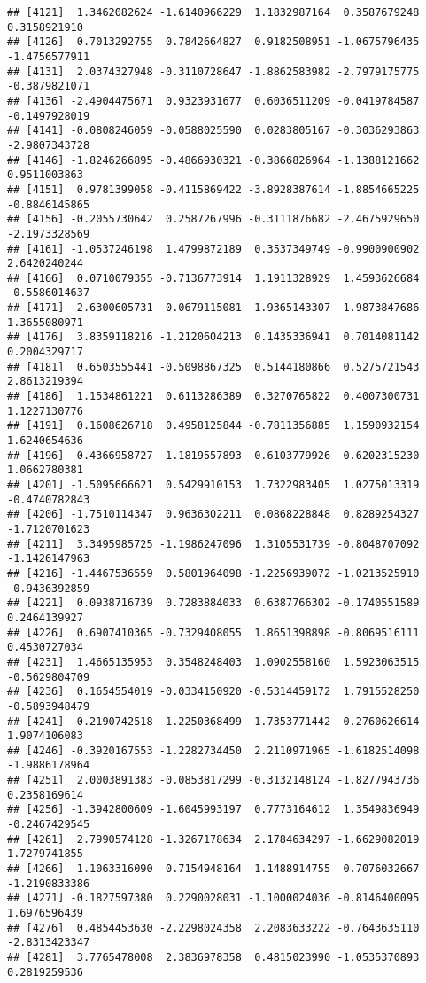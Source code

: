 \documentclass[
]{article}
\begin{document}
\begin{verbatim}
## [4121]  1.3462082624 -1.6140966229  1.1832987164  0.3587679248  0.3158921910
## [4126]  0.7013292755  0.7842664827  0.9182508951 -1.0675796435 -1.4756577911
## [4131]  2.0374327948 -0.3110728647 -1.8862583982 -2.7979175775 -0.3879821071
## [4136] -2.4904475671  0.9323931677  0.6036511209 -0.0419784587 -0.1497928019
## [4141] -0.0808246059 -0.0588025590  0.0283805167 -0.3036293863 -2.9807343728
## [4146] -1.8246266895 -0.4866930321 -0.3866826964 -1.1388121662  0.9511003863
## [4151]  0.9781399058 -0.4115869422 -3.8928387614 -1.8854665225 -0.8846145865
## [4156] -0.2055730642  0.2587267996 -0.3111876682 -2.4675929650 -2.1973328569
## [4161] -1.0537246198  1.4799872189  0.3537349749 -0.9900900902  2.6420240244
## [4166]  0.0710079355 -0.7136773914  1.1911328929  1.4593626684 -0.5586014637
## [4171] -2.6300605731  0.0679115081 -1.9365143307 -1.9873847686  1.3655080971
## [4176]  3.8359118216 -1.2120604213  0.1435336941  0.7014081142  0.2004329717
## [4181]  0.6503555441 -0.5098867325  0.5144180866  0.5275721543  2.8613219394
## [4186]  1.1534861221  0.6113286389  0.3270765822  0.4007300731  1.1227130776
## [4191]  0.1608626718  0.4958125844 -0.7811356885  1.1590932154  1.6240654636
## [4196] -0.4366958727 -1.1819557893 -0.6103779926  0.6202315230  1.0662780381
## [4201] -1.5095666621  0.5429910153  1.7322983405  1.0275013319 -0.4740782843
## [4206] -1.7510114347  0.9636302211  0.0868228848  0.8289254327 -1.7120701623
## [4211]  3.3495985725 -1.1986247096  1.3105531739 -0.8048707092 -1.1426147963
## [4216] -1.4467536559  0.5801964098 -1.2256939072 -1.0213525910 -0.9436392859
## [4221]  0.0938716739  0.7283884033  0.6387766302 -0.1740551589  0.2464139927
## [4226]  0.6907410365 -0.7329408055  1.8651398898 -0.8069516111  0.4530727034
## [4231]  1.4665135953  0.3548248403  1.0902558160  1.5923063515 -0.5629804709
## [4236]  0.1654554019 -0.0334150920 -0.5314459172  1.7915528250 -0.5893948479
## [4241] -0.2190742518  1.2250368499 -1.7353771442 -0.2760626614  1.9074106083
## [4246] -0.3920167553 -1.2282734450  2.2110971965 -1.6182514098 -1.9886178964
## [4251]  2.0003891383 -0.0853817299 -0.3132148124 -1.8277943736  0.2358169614
## [4256] -1.3942800609 -1.6045993197  0.7773164612  1.3549836949 -0.2467429545
## [4261]  2.7990574128 -1.3267178634  2.1784634297 -1.6629082019  1.7279741855
## [4266]  1.1063316090  0.7154948164  1.1488914755  0.7076032667 -1.2190833386
## [4271] -0.1827597380  0.2290028031 -1.1000024036 -0.8146400095  1.6976596439
## [4276]  0.4854453630 -2.2298024358  2.2083633222 -0.7643635110 -2.8313423347
## [4281]  3.7765478008  2.3836978358  0.4815023990 -1.0535370893  0.2819259536

\end{verbatim}
\end{document}
